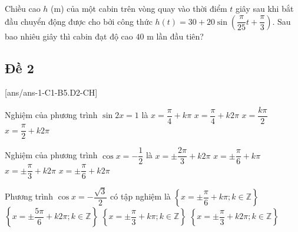 \begin{ex}%
	Chiều cao $h$ (m) của một cabin trên vòng quay vào thời điểm $t$ giây sau khi bắt đầu chuyển động được cho bởi công thức $h(t)=30 + 20\sin \left(\dfrac{\pi}{25}t + \dfrac{\pi}{3}\right)$. Sau bao nhiêu giây thì cabin đạt độ cao $40$ m lần đầu tiên?
\end{ex}
\subsection{Đề 2}
[ans/ans-1-C1-B5.D2-CH]
\caulc
\begin{ex}%
	Nghiệm của phương trình $\sin 2x=1$ là
	\choice
	{\True $x=\dfrac{\pi }{4}+k\pi $}
	{$x=\dfrac{\pi }{4}+k2\pi $}
	{$x=\dfrac{k\pi }{2}$}
	{$x=\dfrac{\pi }{2}+k2\pi $}
\end{ex}

\begin{ex}%
	Nghiệm của phương trình $\cos x=- \dfrac{1}{2}$ là
	\choice
	{\True $x=\pm \dfrac{2\pi }{3}+k2\pi $}
	{$x=\pm \dfrac{\pi }{6}+k\pi $}
	{$x=\pm \dfrac{\pi }{3}+k2\pi $}
	{$x=\pm \dfrac{\pi }{6}+k2\pi $}
\end{ex}

\begin{ex}%
	Phương trình $\cos x=-\dfrac{\sqrt{3}}{2}$ có tập nghiệm là
	\choice
	{$\left\{ x=\pm \dfrac{\pi }{6}+k\pi ; k\in \mathbb{Z} \right\}$}
	{\True $\left\{ x=\pm \dfrac{5\pi }{6}+k2\pi ; k\in \mathbb{Z} \right\}$}
	{$\left\{ x=\pm \dfrac{\pi }{3}+k\pi ; k\in \mathbb{Z} \right\}$}
	{$\left\{ x=\pm \dfrac{\pi }{3}+k2\pi ; k\in \mathbb{Z} \right\}$}
\end{ex}

